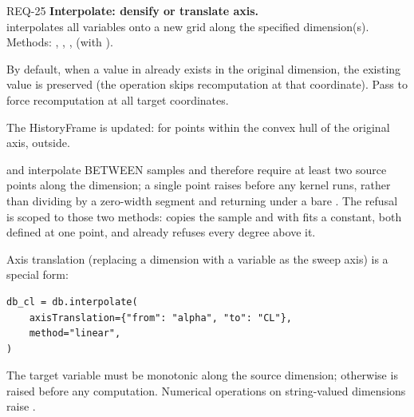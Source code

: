 \begin{reqbox}{REQ-25}{\stable}
\textbf{Interpolate: densify or translate axis.}\\
 interpolates all variables onto a new grid along the
specified dimension(s). Methods: , ,
,  (with ).

By default, when a value in  already exists in the
original dimension, the existing value is preserved (the operation skips
recomputation at that coordinate). Pass  to force
recomputation at all target coordinates.

The HistoryFrame is updated:  for points within the convex hull of
the original axis,  outside.

 and  interpolate BETWEEN samples and
therefore require at least two source points along the dimension; a
single point raises  before any kernel runs, rather than
dividing by a zero-width segment and returning  under a bare
. The refusal is scoped to those two methods:
 copies the sample and  with
 fits a constant, both defined at one point, and
 already refuses every degree above it.

Axis translation (replacing a dimension with a variable as the sweep axis) is a special form:
\begin{lstlisting}
db_cl = db.interpolate(
    axisTranslation={"from": "alpha", "to": "CL"},
    method="linear",
)
\end{lstlisting}
The target variable must be monotonic along the source dimension;
otherwise  is raised before any computation.
Numerical operations on string-valued dimensions raise
.
\end{reqbox}

